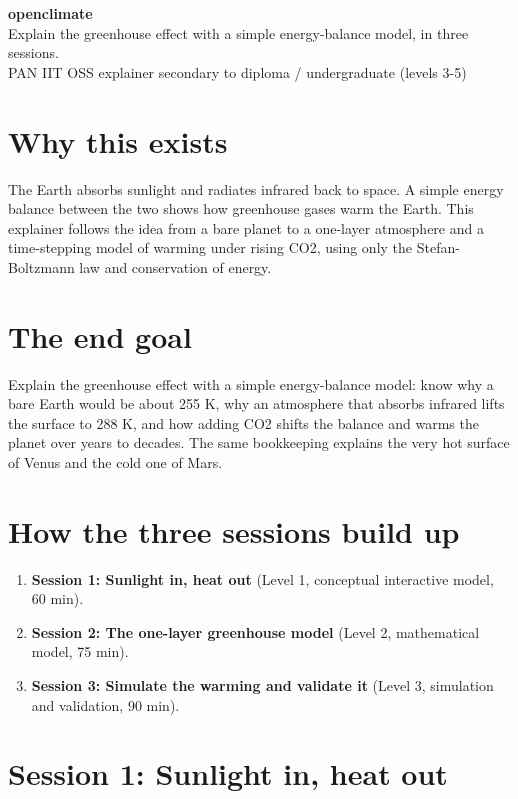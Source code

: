\documentclass[11pt,a4paper]{article}
\begin{document}
\begin{center}{\LARGE\bfseries openclimate}\\[0.4em]{\large Explain the greenhouse effect with a simple energy-balance model, in three sessions.}\\[0.2em]\small PAN IIT OSS explainer \textbullet{} secondary to diploma / undergraduate (levels 3-5)\end{center}

\section*{Why this exists}
The Earth absorbs sunlight and radiates infrared back to space. A simple energy balance between the two shows how greenhouse gases warm the Earth. This explainer follows the idea from a bare planet to a one-layer atmosphere and a time-stepping model of warming under rising CO2, using only the Stefan-Boltzmann law and conservation of energy.

\section*{The end goal}
Explain the greenhouse effect with a simple energy-balance model: know why a bare Earth would be about 255 K, why an atmosphere that absorbs infrared lifts the surface to 288 K, and how adding CO2 shifts the balance and warms the planet over years to decades. The same bookkeeping explains the very hot surface of Venus and the cold one of Mars.

\section*{How the three sessions build up}
\begin{enumerate}[nosep]
\item \textbf{Session 1: Sunlight in, heat out} (Level 1, conceptual interactive model, 60 min).
\item \textbf{Session 2: The one-layer greenhouse model} (Level 2, mathematical model, 75 min).
\item \textbf{Session 3: Simulate the warming and validate it} (Level 3, simulation and validation, 90 min).
\end{enumerate}

\section{Session 1: Sunlight in, heat out}
\end{document}
